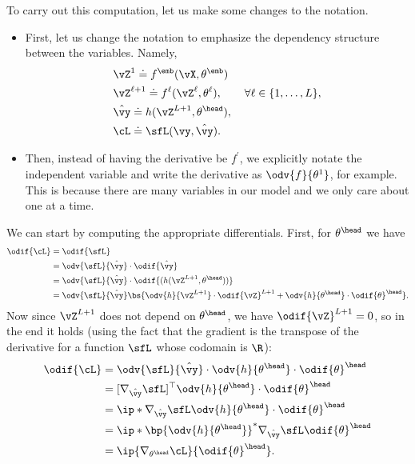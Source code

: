\documentclass[../../book-main.tex]{subfiles}
\begin{document}
To carry out this computation, let us make some changes to the notation.
\begin{itemize}
    \item First, let us change the notation to emphasize the
        dependency structure between the variables. Namely,
        \begin{align}
            &\vZ^{1} \doteq f^{\emb}(\vX, \theta^{\emb}) \\
            &\vZ^{\ell + 1} \doteq f^{\ell}(\vZ^{\ell},
            \theta^{\ell}), \qquad \forall \ell \in \{1, \dots, L\}, \\
            &\hat{\vy} \doteq h(\vZ^{L+1}, \theta^{\head}), \\
            &\cL \doteq \sfL(\vy, \hat{\vy}).
        \end{align}
    \item Then, instead of having the derivative be \(f^{\prime}\),
        we explicitly notate the independent variable and write the
        derivative as \(\odv{f}{\theta^{1}}\), for example. This is
        because there are many variables in our model and we only
        care about one at a time.
\end{itemize}
We can start by computing the appropriate differentials. First, for
\(\theta^{\head}\) we have
\begin{align}
    \odif{\cL}
    &= \odif{\sfL} \\
    &= \odv{\sfL}{\hat{\vy}}\cdot\odif{\hat{\vy}} \\
    &= \odv{\sfL}{\hat{\vy}}\cdot\odif{{(h(\vZ^{L + 1}, \theta^{\head}))}} \\
    &= \odv{\sfL}{\hat{\vy}}\bs{\odv{h}{\vZ^{L +
        1}}\cdot\odif{\vZ}^{L + 1} +
    \odv{h}{\theta^{\head}}\cdot\odif{\theta}^{\head}}.
\end{align}
Now since \(\vZ^{L + 1}\) does not depend on \(\theta^{\head}\), we
have \(\odif{\vZ}^{L + 1} = 0\), so in the end it holds (using the
    fact that the gradient is the transpose of the derivative for a
function \(\sfL\) whose codomain is \(\R\)):
\begin{align}
    \odif{\cL}
    &=
    \odv{\sfL}{\hat{\vy}}\cdot\odv{h}{\theta^{\head}}\cdot\odif{\theta}^{\head}
    \\
    &=
    [\nabla_{\hat{\vy}}\sfL]^{\top}\odv{h}{\theta^{\head}}\cdot\odif{\theta}^{\head}
    \\
    &=
    \ip*{\nabla_{\hat{\vy}}\sfL}{\odv{h}{\theta^{\head}}\cdot\odif{\theta}^{\head}}
    \\
    &=
    \ip*{\bp{\odv{h}{\theta^{\head}}}^{*}\nabla_{\hat{\vy}}\sfL}{\odif{\theta}^{\head}}
    \\
    &= \ip{\nabla_{\theta^{\head}}\cL}{\odif{\theta}^{\head}}.
\end{align}
\end{document}
